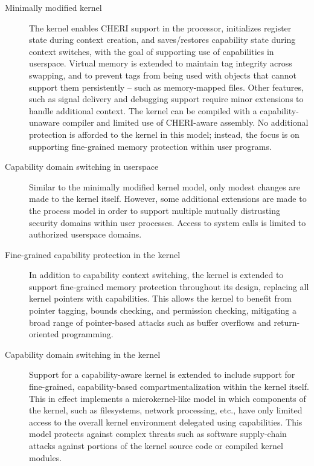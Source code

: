\begin{description}
\item[Minimally modified kernel] The kernel enables CHERI support in the
  processor, initializes register state during context creation, and
  saves/restores capability state during context switches, with the goal of
  supporting use of capabilities in userspace.
  Virtual memory is extended to maintain tag
integrity
  across swapping, and to prevent
  tags from being used with objects that cannot support them persistently
  -- such as memory-mapped files.
  Other features, such as signal delivery and debugging support require minor
  extensions to handle additional context.
  The kernel can be compiled with a capability-unaware compiler and limited
  use of CHERI-aware assembly.
  No additional protection is afforded to the kernel in this model; instead,
  the focus is on supporting fine-grained memory protection within user
  programs.

\item[Capability domain switching in userspace] Similar
  to the minimally modified kernel model,
  only modest changes are made to the kernel itself.
  However, some additional extensions are made to the process model in order
  to support multiple mutually distrusting security domains within user
  processes.
  Access to system calls is limited to authorized userspace domains.

\item[Fine-grained capability protection in the kernel] In addition to
  capability context switching, the kernel is extended to support fine-grained
  memory protection throughout its design, replacing all kernel pointers with
  capabilities.
  This allows the kernel to benefit from pointer tagging, bounds checking, and
  permission checking, mitigating a broad range of pointer-based attacks such
  as buffer overflows and return-oriented programming.

\item[Capability domain switching in the kernel] Support for a
  capability-aware kernel is extended to include support for fine-grained,
  capability-based compartmentalization within the kernel itself.
  This in effect implements a microkernel-like model in which components of
the kernel, such as filesystems, network processing, etc., have only limited
  access to the overall kernel environment delegated using capabilities.
  This model protects against complex threats such as software supply-chain
  attacks against portions of the kernel source code or compiled kernel
  modules.


\end{description}
